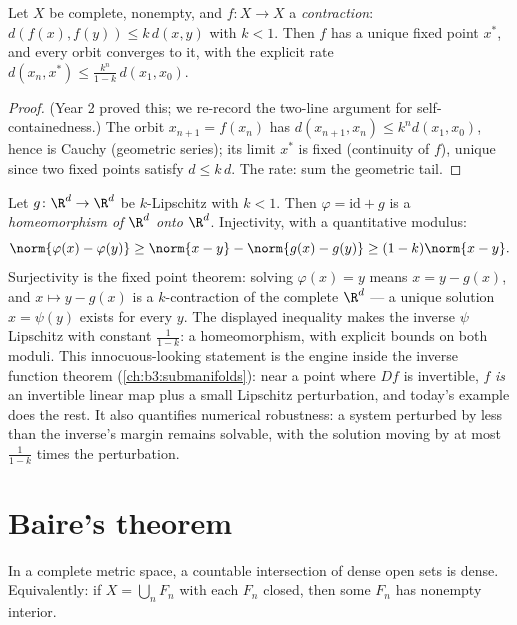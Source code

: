 \begin{theorem}\label{thm:b3:complete:banach}
Let $X$ be complete, nonempty, and $f \colon X \to X$ a
\emph{contraction}: $d(f(x), f(y)) \leq k\,d(x,y)$ with $k < 1$.
Then $f$ has a unique fixed point $x^*$, and every orbit
converges to it, with the explicit rate $d(x_n, x^*) \leq
\frac{k^n}{1-k}\,d(x_1, x_0)$.
\end{theorem}

\begin{proof}
(Year 2 proved this; we re-record the two-line argument for
self-containedness.) The orbit $x_{n+1} = f(x_n)$ has $d(x_{n+1},
x_n) \leq k^nd(x_1, x_0)$, hence is Cauchy (geometric series);
its limit $x^*$ is fixed (continuity of $f$), unique since two
fixed points satisfy $d \leq k\,d$. The rate: sum the geometric
tail.
\end{proof}

\begin{example}
\label{ex:b3:complete:perturbident}
Let $g \colon \R^d \to \R^d$ be $k$-Lipschitz with $k < 1$.
Then $\varphi = \mathrm{id} + g$ is a \emph{homeomorphism of
$\R^d$ onto $\R^d$}. Injectivity, with a quantitative
modulus:
\[
\norm{\varphi(x) - \varphi(y)} \geq \norm{x - y} -
\norm{g(x) - g(y)} \geq (1 - k)\norm{x - y} .
\]
Surjectivity is the fixed point theorem: solving
$\varphi(x) = y$ means $x = y - g(x)$, and $x \mapsto y -
g(x)$ is a $k$-contraction of the complete $\R^d$ --- a
unique solution $x = \psi(y)$ exists for every $y$. The
displayed inequality makes the inverse $\psi$ Lipschitz with
constant $\frac1{1-k}$: a homeomorphism, with explicit
bounds on both moduli. This innocuous-looking statement is
the engine inside the inverse function theorem
(\cref{ch:b3:submanifolds}): near a point where $Df$ is
invertible, $f$ \emph{is} an invertible linear map plus a
small Lipschitz perturbation, and today's example does the
rest. It also quantifies numerical robustness: a system
perturbed by less than the inverse's margin remains
solvable, with the solution moving by at most
$\frac{1}{1-k}$ times the perturbation.
\end{example}

\section{Baire's theorem}

\begin{theorem}[Baire]\label{thm:b3:complete:baire}
In a complete metric space, a countable intersection of dense
open sets is dense. Equivalently: if $X = \bigcup_{n}F_n$ with
each $F_n$ closed, then some $F_n$ has nonempty
interior.
\end{theorem}

